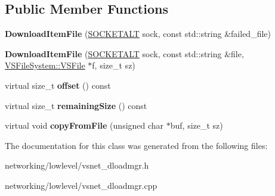 \subsection*{Public Member Functions}
\begin{DoxyCompactItemize}
\item 
{\bfseries Download\+Item\+File} (\hyperlink{classSOCKETALT}{S\+O\+C\+K\+E\+T\+A\+LT} sock, const std\+::string \&failed\+\_\+file)\hypertarget{classVsnetDownload_1_1Server_1_1DownloadItemFile_ab986164881238d5587c353f8f6e3ac0a}{}\label{classVsnetDownload_1_1Server_1_1DownloadItemFile_ab986164881238d5587c353f8f6e3ac0a}

\item 
{\bfseries Download\+Item\+File} (\hyperlink{classSOCKETALT}{S\+O\+C\+K\+E\+T\+A\+LT} sock, const std\+::string \&file, \hyperlink{classVSFileSystem_1_1VSFile}{V\+S\+File\+System\+::\+V\+S\+File} $\ast$f, size\+\_\+t sz)\hypertarget{classVsnetDownload_1_1Server_1_1DownloadItemFile_a126325df265dc4dfe7e831df22ae60e8}{}\label{classVsnetDownload_1_1Server_1_1DownloadItemFile_a126325df265dc4dfe7e831df22ae60e8}

\item 
virtual size\+\_\+t {\bfseries offset} () const \hypertarget{classVsnetDownload_1_1Server_1_1DownloadItemFile_a5c08dc1db0d0a4c5ce59480709567852}{}\label{classVsnetDownload_1_1Server_1_1DownloadItemFile_a5c08dc1db0d0a4c5ce59480709567852}

\item 
virtual size\+\_\+t {\bfseries remaining\+Size} () const \hypertarget{classVsnetDownload_1_1Server_1_1DownloadItemFile_a1677eef26b62667bad6ddaed5d7a9c69}{}\label{classVsnetDownload_1_1Server_1_1DownloadItemFile_a1677eef26b62667bad6ddaed5d7a9c69}

\item 
virtual void {\bfseries copy\+From\+File} (unsigned char $\ast$buf, size\+\_\+t sz)\hypertarget{classVsnetDownload_1_1Server_1_1DownloadItemFile_adedef6520872f5daf2c5a242dbfa2c1f}{}\label{classVsnetDownload_1_1Server_1_1DownloadItemFile_adedef6520872f5daf2c5a242dbfa2c1f}

\end{DoxyCompactItemize}


The documentation for this class was generated from the following files\+:\begin{DoxyCompactItemize}
\item 
networking/lowlevel/vsnet\+\_\+dloadmgr.\+h\item 
networking/lowlevel/vsnet\+\_\+dloadmgr.\+cpp\end{DoxyCompactItemize}
